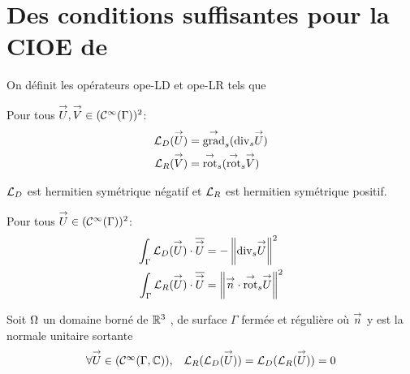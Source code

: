 \section[Des CSU pour la CIOE de Marceaux 2000]{Des conditions suffisantes pour la CIOE de \cite{marceaux_high-order_2000}}

  \begin{defn}
    On définit les opérateurs \gls{ope-LD} et \gls{ope-LR} tels que %

    Pour tous \(\vect U,\vect V \in (\mathcal{C}^\infty(\Gamma))^2\): 
    \begin{align*}
      \LD(\vect U) &= \tgrads (\tdivs \vect U)
      \\
      \LR(\vect V) &= \tvrots( \tvrots \vect V)
    \end{align*}
  \end{defn}

  \begin{prop}
    \(\LD\) est hermitien symétrique négatif et \(\LR\) est hermitien symétrique positif.

    Pour tous \(\vect U \in (\mathcal{C}^\infty(\Gamma))^2\): 
    \begin{align*}
      \int_\Gamma \LD(\vect U)\cdot \conj{\vect U} &= -\norm{\tdivs \vect U}^2
      \\
      \int_\Gamma \LR(\vect U)\cdot \conj{\vect U} &=\norm{\vn \cdot \tvrots \vect U}^2
    \end{align*}
  \end{prop}

  \begin{prop}
    Soit \(\OO\) un domaine borné de \(\RR^3\) , de surface \(\Gamma\) fermée et régulière où \(\vect n\) y est la normale unitaire
    sortante
    \begin{equation}
      \begin{matrix}
        \forall \vect U \in (\mathcal{C}^\infty(\Gamma,\CC)) ,& \LR(\LD(\vect U)) = \LD(\LR(\vect U)) = 0
      \end{matrix}
    \end{equation}
  \end{prop}

